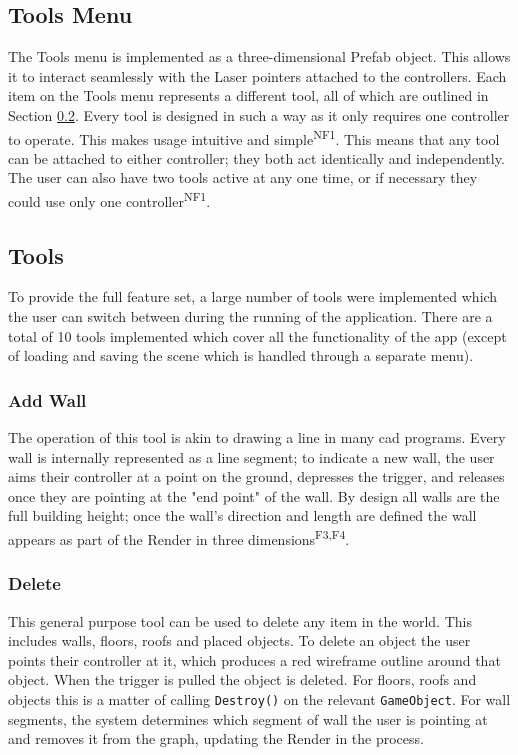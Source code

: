 \subsection{Tools Menu}

The Tools menu is implemented as a three-dimensional Prefab object. This allows it to interact seamlessly with the Laser pointers attached to the controllers. Each item on the Tools menu represents a different tool, all of which are outlined in Section \ref{sec:alltools}. Every tool is designed in such a way as it only requires one controller to operate. This makes usage intuitive and simple\textsuperscript{NF1}. This means that any tool can be attached to either controller; they both act identically and independently. The user can also have two tools active at any one time, or if necessary they could use only one controller\textsuperscript{NF1}.

\subsection{Tools}
\label{sec:alltools}

To provide the full feature set, a large number of tools were implemented which the user can switch between during the running of the application. There are a total of 10 tools implemented which cover all the functionality of the app (except of loading and saving the scene which is handled through a separate menu).

\subsubsection*{Add Wall}
The operation of this tool is akin to drawing a line in many \acrshort{cad} programs. Every wall is internally represented as a line segment; to indicate a new wall, the user aims their controller at a point on the ground, depresses the trigger, and releases once they are pointing at the "end point" of the wall. By design all walls are the full building height; once the wall's direction and length are defined the wall appears as part of the Render in three dimensions\textsuperscript{F3,F4}.

\subsubsection*{Delete}
This general purpose tool can be used to delete any item in the world. This includes walls, floors, roofs and placed objects. To delete an object the user points their controller at it, which produces a red wireframe outline around that object. When the trigger is pulled the object is deleted. For floors, roofs and objects this is a matter of calling \verb|Destroy()| on the relevant \verb|GameObject|. For wall segments, the system determines which segment of wall the user is pointing at and removes it from the graph, updating the Render in the process.

